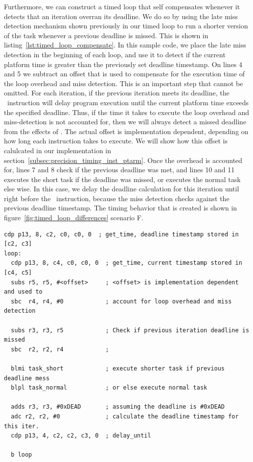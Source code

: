 Furthermore, we can construct a timed loop that self compensates whenever it detects that an iteration overran its deadline. 
We do so by using the late miss detection mechanism shown previously in our timed loop to run a shorter version of the task whenever a previous deadline is missed.
This is shown in listing~\ref{lst:timed_loop_compensate}. 
In this sample code, we place the late miss detection in the beginning of each loop, and use it to detect if the current platform time is greater than the previously set deadline timestamp.
On lines 4 and 5 we subtract an offset that is used to compensate for the execution time of the loop overhead and miss detection. 
This is an important step that cannot be omitted.
For each iteration, if the previous iteration meets its deadline, the \delayuntil\ instruction will delay program execution until the current platform time exceeds the specified deadline. 
Thus, if the time it takes to execute the loop overhead and miss-detection is not accounted for, then we will always detect a missed deadline from the effects of \delayuntil.  
The actual offset is implementation dependent, depending on how long each instruction takes to execute.
We will show how this offset is calulcated in our implementation in section~\ref{subsec:precision_timing_inst_ptarm}.
Once the overhead is accounted for, lines 7 and 8 check if the previous deadline was met, and lines 10 and 11 executes the short task if the deadline was missed, or executes the normal task else wise.
In this case, we delay the deadline calculation for this iteration until right before the \delayuntil\ instruction, because the miss detection checks against the previous deadline timestamp.      
The timing behavior that is created is shown in figure~\ref{fig:timed_loop_differences} scenario F. 
\vspace{-4mm}
\begin{lstlisting}[float=h, label=lst:timed_loop_compensate,caption=Timed loops with compensation ]
  cdp p13, 8, c2, c0, c0, 0  ; get_time, deadline timestamp stored in [c2, c3]
loop:
  cdp p13, 8, c4, c0, c0, 0  ; get_time, current timestamp stored in [c4, c5]
  subs r5, r5, #<offset>     ; <offset> is implementation dependent and used to 
  sbc  r4, r4, #0            ; account for loop overhead and miss detection

  subs r3, r3, r5            ; Check if previous iteration deadline is missed
  sbc  r2, r2, r4            ; 

  blmi task_short            ; execute shorter task if previous deadline mess 
  blpl task_normal           ; or else execute normal task 
  
  adds r3, r3, #0xDEAD       ; assuming the deadline is #0xDEAD
  adc r2, r2, #0             ; calculate the deadline timestamp for this iter.
  cdp p13, 4, c2, c2, c3, 0  ; delay_until
   
  b loop
\end{lstlisting}
\vspace{-2mm}

